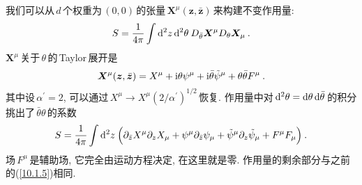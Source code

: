 我们可以从$\,d\,$个权重为$\,(0,0)\,$的张量$\,\bm{X}^{\mu}(\bm{z},\bar{\bm{z}})\,$来构建不变作用量:
\begin{equation}
    S= \frac{1}{4\pi} \int \mathrm{d}^{2}z\,\mathrm{d}^{2}\theta\: D_{\bar{\theta}}\bm{X}^{\mu}D_{\theta}\bm{X}_{\mu}\:.\label{12.3.18} 
\end{equation}
$\bm{X}^{\mu}$\,关于$\,\theta\,$的\,Taylor\,展开是
\begin{equation}
    \bm{X}^{\mu}(\bm{z},\bar{\bm{z}})=X^{\mu}+\mathrm{i}\theta \psi^{\mu}+\mathrm{i}\bar{\theta}\tilde{\psi}^{\mu}
    +\theta\bar{\theta}F^{\mu} \:. \label{12.3.19}
\end{equation}
其中设$\,\alpha^{\prime}=2$, 可以通过$\,X^{\mu}\to X^{\mu}(2/\alpha^{\prime})^{1/2}\,$恢复. 作用量中对$\,\mathrm{d}^{2}\theta=\mathrm{d}\theta\,\mathrm{d}\bar{\theta}\,$的积分挑出了$\,\bar{\theta}\theta\,$的系数
\begin{equation}
    S=\frac{1}{4\pi}\int\mathrm{d}^{2}z\:\Bigl(\partial_{\bar{z}}X^{\mu}\partial_{z}X_{\mu}+\psi^{\mu}\partial_{\bar{z}}\psi_{\mu}+\tilde{\psi}^{\mu}\partial_{z}\tilde{\psi}_{\mu}+F^{\mu}F_{\mu}\Bigr) \:. \label{12.3.20}
\end{equation}
场$\,F^{\mu}\,$是辅助场, 它完全由运动方程决定, 在这里就是零. 作用量的剩余部分与之前的(\ref{10.1.5})相同.

